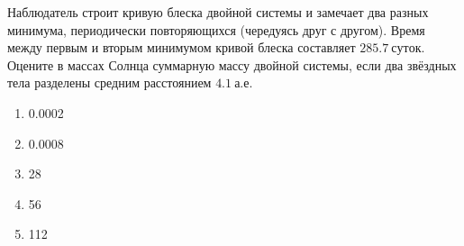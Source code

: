 Наблюдатель строит кривую блеска двойной системы и замечает
два разных минимума, периодически повторяющихся (чередуясь друг с другом).
Время между первым и вторым минимумом кривой блеска составляет $\qty{285.7}{суток}$. Оцените в массах Солнца суммарную массу двойной системы, если два
звёздных тела разделены средним расстоянием $\qty{4.1}{а.е.}$

\begin{enumerate}[label=\alph*)]
  \item 0.0002
  \item 0.0008
  \item 28
  \item 56
  \item 112
\end{enumerate}
